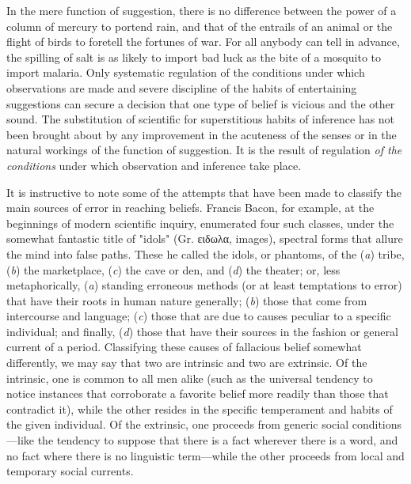 \documentclass[showtrims,ustradepaper]{memoir}
\begin{document}

In the mere function of suggestion, there is no difference between the
power of a column of mercury to portend rain, and that of the entrails
of an animal or the flight of birds to foretell the fortunes of war. For
all anybody can tell in advance, the spilling of salt is as likely to
import bad luck as the bite of a mosquito to import malaria. Only
systematic regulation of the conditions under which observations are
made and severe discipline of the habits of entertaining suggestions can
secure a decision that one type of belief is vicious and the other
sound. The substitution of scientific for superstitious habits of
inference has not been brought about by any improvement in the acuteness
of the senses or in the natural workings of the function of suggestion.
It is the result of regulation \emph{of the conditions} under which
observation and inference take
place.


It is instructive to note some of the attempts that have been made to
classify the main sources of error in reaching beliefs. Francis Bacon,
for example, at the beginnings of modern scientific inquiry, enumerated
four such classes, under the somewhat fantastic title of "idols" (Gr.
\textgreek{ειδωλα}, images), spectral forms that allure the mind into
false paths. These he called the idols, or phantoms, of the (\emph{a})
tribe, (\emph{b}) the marketplace, (\emph{c}) the cave or den, and
(\emph{d}) the theater; or, less metaphorically, (\emph{a}) standing
erroneous methods (or at least temptations to error) that have their
roots in human nature generally; (\emph{b}) those that come from
intercourse and language; (\emph{c}) those that are due to causes
peculiar to a specific individual; and finally, (\emph{d}) those that
have their sources in the fashion or general current of a period.
Classifying these causes of fallacious belief somewhat differently, we
may say that two are intrinsic and two are extrinsic. Of the intrinsic,
one is common to all men alike (such as the universal tendency to notice
instances that corroborate a favorite belief more readily than those
that contradict it), while the other resides in the specific temperament
and habits of the given individual. Of the extrinsic, one proceeds from
generic social conditions---like the tendency to suppose that there is a
fact wherever there is a word, and no fact where there is no linguistic
term---while the other proceeds from local and temporary social
currents.
\end{document}
